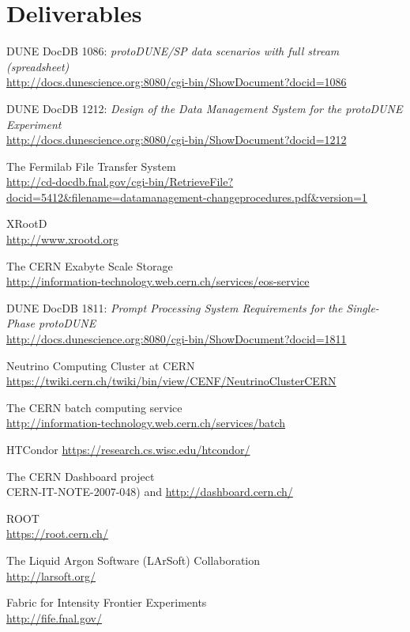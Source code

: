 \documentclass[pdftex,12pt,letter]{article}
\begin{document}
\section{Deliverables}


\clearpage
\begin{thebibliography}{1}

{DUNE DocDB 1086: \textit{ protoDUNE/SP data scenarios with full stream (spreadsheet)}}\\
\url{http://docs.dunescience.org:8080/cgi-bin/ShowDocument?docid=1086}




{DUNE DocDB 1212: \textit{Design of the Data Management System for the protoDUNE Experiment}}\\
\url{http://docs.dunescience.org:8080/cgi-bin/ShowDocument?docid=1212}

{The Fermilab File Transfer System}\\
\url{http://cd-docdb.fnal.gov/cgi-bin/RetrieveFile?docid=5412&filename=datamanagement-changeprocedures.pdf&version=1}


{XRootD}\\
\url{http://www.xrootd.org}

{The CERN Exabyte Scale Storage}\\
\url{http://information-technology.web.cern.ch/services/eos-service}



{DUNE DocDB 1811: \textit{Prompt Processing System Requirements for the Single-Phase protoDUNE}}\\
\url{http://docs.dunescience.org:8080/cgi-bin/ShowDocument?docid=1811}



{Neutrino Computing Cluster at CERN}\\
\url{https://twiki.cern.ch/twiki/bin/view/CENF/NeutrinoClusterCERN}

{The CERN batch computing service}\\
\url{http://information-technology.web.cern.ch/services/batch}


{HTCondor}
\url{https://research.cs.wisc.edu/htcondor/}

{The CERN Dashboard project}\\
CERN-IT-NOTE-2007-048) and \url{http://dashboard.cern.ch/}

{ROOT}\\
\url{https://root.cern.ch/}


{The Liquid Argon Software (LArSoft) Collaboration}\\
\url{http://larsoft.org/}

{Fabric for Intensity Frontier Experiments}\\
\url{http://fife.fnal.gov/}



\end{thebibliography}
\end{document}
